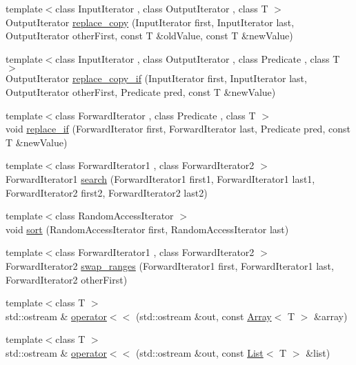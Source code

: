 \begin{DoxyCompactItemize}
\item 
{\footnotesize template$<$class Input\+Iterator , class Output\+Iterator , class T $>$ }\\Output\+Iterator \hyperlink{namespaceprism_a16d85ecb70d2f216714a0146a057a105}{replace\+\_\+copy} (Input\+Iterator first, Input\+Iterator last, Output\+Iterator other\+First, const T \&old\+Value, const T \&new\+Value)
\item 
{\footnotesize template$<$class Input\+Iterator , class Output\+Iterator , class Predicate , class T $>$ }\\Output\+Iterator \hyperlink{namespaceprism_a55d702599739f7137516dcd095119f15}{replace\+\_\+copy\+\_\+if} (Input\+Iterator first, Input\+Iterator last, Output\+Iterator other\+First, Predicate pred, const T \&new\+Value)
\item 
{\footnotesize template$<$class Forward\+Iterator , class Predicate , class T $>$ }\\void \hyperlink{namespaceprism_af118c19f6b5448319eb3aaf2d556ac54}{replace\+\_\+if} (Forward\+Iterator first, Forward\+Iterator last, Predicate pred, const T \&new\+Value)
\item 
{\footnotesize template$<$class Forward\+Iterator1 , class Forward\+Iterator2 $>$ }\\Forward\+Iterator1 \hyperlink{namespaceprism_affcb3e5150d72d9f79b85b9ea4eb41e2}{search} (Forward\+Iterator1 first1, Forward\+Iterator1 last1, Forward\+Iterator2 first2, Forward\+Iterator2 last2)
\item 
{\footnotesize template$<$class Random\+Access\+Iterator $>$ }\\void \hyperlink{namespaceprism_af8ceeac6329dade75da361abe8b15c5f}{sort} (Random\+Access\+Iterator first, Random\+Access\+Iterator last)
\item 
{\footnotesize template$<$class Forward\+Iterator1 , class Forward\+Iterator2 $>$ }\\Forward\+Iterator2 \hyperlink{namespaceprism_a4661f2c0c4dca098c137179b4d93f3dc}{swap\+\_\+ranges} (Forward\+Iterator1 first, Forward\+Iterator1 last, Forward\+Iterator2 other\+First)
\item 
{\footnotesize template$<$class T $>$ }\\std\+::ostream \& \hyperlink{namespaceprism_a403ca8f79c481a89132691c0fd8c3a06}{operator$<$$<$} (std\+::ostream \&out, const \hyperlink{classprism_1_1_array}{Array}$<$ T $>$ \&array)
\item 
{\footnotesize template$<$class T $>$ }\\std\+::ostream \& \hyperlink{namespaceprism_a50da64555d454821545fe0311fde6a62}{operator$<$$<$} (std\+::ostream \&out, const \hyperlink{classprism_1_1_list}{List}$<$ T $>$ \&list)

\end{DoxyCompactItemize}
